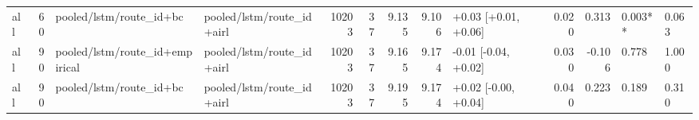 \begin{tabular}{lrllrrrrlrrll}
all & 60 & pooled/lstm/route_id+bc & pooled/lstm/route_id+airl & 10203 & 37 & 9.135 & 9.106 & +0.03 [+0.01, +0.06] & 0.020 & 0.313 & 0.003** & 0.063 \\
all & 90 & pooled/lstm/route_id+empirical & pooled/lstm/route_id+airl & 10203 & 37 & 9.165 & 9.174 & -0.01 [-0.04, +0.02] & 0.030 & -0.106 & 0.778 & 1.000 \\
all & 90 & pooled/lstm/route_id+bc & pooled/lstm/route_id+airl & 10203 & 37 & 9.195 & 9.174 & +0.02 [-0.00, +0.04] & 0.040 & 0.223 & 0.189 & 0.310 \\
\bottomrule
\end{tabular}
